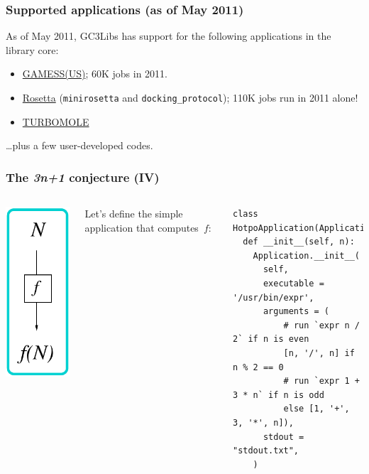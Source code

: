 \documentclass[presentation]{beamer}
\begin{document}
\begin{frame}
  \frametitle{Supported applications (as of May 2011)}
  
  As of May 2011, GC3Libs has support for the following applications
  in the library core:
  \begin{itemize}
  \item \href{http://www.msg.ameslab.gov/gamess/}{GAMESS(US)}; 60K
    jobs in 2011.
  \item \href{http://www.rosettacommons.org}{Rosetta}
    (\texttt{minirosetta} and \texttt{docking{\_}protocol}); 110K jobs
    run in 2011 alone!
  \item \href{http://www.turbomole.com/}{TURBOMOLE}
  \end{itemize}
  \ldots plus a few user-developed codes.

\end{frame}

\begin{frame}[fragile]
\frametitle{The \emph{3n+1} conjecture (IV)}
\label{sec:10}

\begin{columns}
  \begin{center}
    \includegraphics[height=0.8\textheight]{A}
  \end{center}

  Let's define the simple application that computes~$f$:
\begin{lstlisting}
class HotpoApplication(Application):
  def __init__(self, n):
    Application.__init__(
      self,
      executable = '/usr/bin/expr',
      arguments = (
          # run `expr n / 2` if n is even
          [n, '/', n] if n % 2 == 0
          # run `expr 1 + 3 * n` if n is odd
          else [1, '+', 3, '*', n]),
      stdout = "stdout.txt",
    )
\end{lstlisting}
  \end{columns}
\end{frame}
\end{document}
